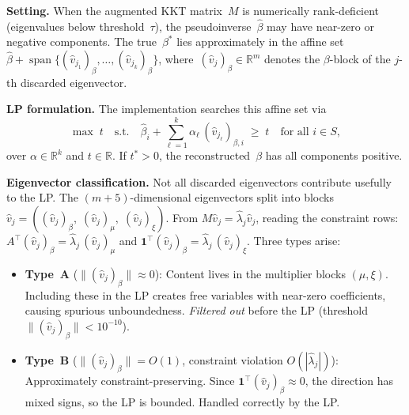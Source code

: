 \begin{unverified}
\begin{remark}%
\label{rem:near-null-lp-search}

\noindent\textbf{Setting.}
When the augmented KKT matrix~$M$ is numerically rank-deficient
(eigenvalues below threshold~$\tau$),
the pseudoinverse~$\hat\beta$ may have near-zero or negative components.
The true~$\beta^*$ lies approximately in the affine set
$\hat\beta + \operatorname{span}\{
  (\hat v_{j_1})_\beta, \ldots,
  (\hat v_{j_k})_\beta\}$,
where~$(\hat v_j)_\beta \in \mathbb{R}^m$ denotes the
$\beta$-block of the $j$-th discarded eigenvector.

\medskip\noindent\textbf{LP formulation.}
The implementation searches this affine set via
\[
  \max\; t \quad \text{s.t.}\quad
  \hat\beta_i + \sum_{\ell=1}^{k} \alpha_\ell\,
    (\hat v_{j_\ell})_{\beta,i} \;\geq\; t
  \quad \text{for all } i \in S,
\]
over $\alpha \in \mathbb{R}^k$ and $t \in \mathbb{R}$.
If $t^* > 0$, the reconstructed~$\beta$ has all components positive.

\medskip\noindent\textbf{Eigenvector classification.}
Not all discarded eigenvectors contribute usefully to the LP.
The $(m{+}5)$-dimensional eigenvectors split into blocks
$\hat v_j = ((\hat v_j)_\beta,\; (\hat v_j)_\mu,\; (\hat v_j)_\xi)$.
From $M\hat v_j = \hat\lambda_j \hat v_j$, reading the constraint rows:
$A^\top (\hat v_j)_\beta = \hat\lambda_j\, (\hat v_j)_\mu$
and
$\mathbf{1}^\top (\hat v_j)_\beta = \hat\lambda_j\, (\hat v_j)_\xi$.
Three types arise:

\begin{itemize}
\item \textbf{Type~A} ($\|(\hat v_j)_\beta\| \approx 0$):
  Content lives in the multiplier blocks $(\mu, \xi)$.
  Including these in the LP creates free variables with
  near-zero coefficients, causing spurious unboundedness.
  \emph{Filtered out} before the LP
  (threshold $\|(\hat v_j)_\beta\| < 10^{-10}$).

\item \textbf{Type~B} ($\|(\hat v_j)_\beta\| = O(1)$,
  constraint violation $O(|\hat\lambda_j|)$):
  Approximately constraint-preserving.
  Since $\mathbf{1}^\top (\hat v_j)_\beta \approx 0$,
  the direction has mixed signs,
  so the LP is bounded.
  Handled correctly by the LP.


\end{itemize}
\end{remark}
\end{unverified}
